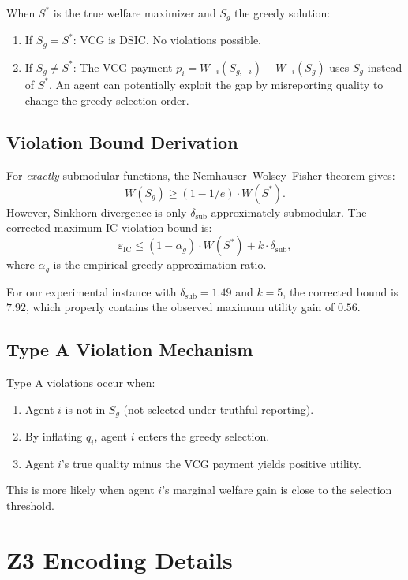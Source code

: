 \documentclass[10pt]{article}
\begin{document}
When $S^*$ is the true welfare maximizer and $S_g$ the greedy solution:
\begin{enumerate}
\item If $S_g = S^*$: VCG is DSIC. No violations possible.
\item If $S_g \neq S^*$: The VCG payment $p_i = W_{-i}(S_{g,-i}) - W_{-i}(S_g)$ uses $S_g$ instead of $S^*$. An agent can potentially exploit the gap by misreporting quality to change the greedy selection order.
\end{enumerate}

\subsection{Violation Bound Derivation}

For \emph{exactly} submodular functions, the Nemhauser--Wolsey--Fisher theorem gives:
\[
W(S_g) \geq (1 - 1/e) \cdot W(S^*).
\]
However, Sinkhorn divergence is only $\delta_{\mathrm{sub}}$-approximately submodular.
The corrected maximum IC violation bound is:
\[
\varepsilon_{\mathrm{IC}} \leq (1 - \alpha_g) \cdot W(S^*) + k \cdot \delta_{\mathrm{sub}},
\]
where $\alpha_g$ is the empirical greedy approximation ratio.

For our experimental instance with $\delta_{\mathrm{sub}} = 1.49$ and $k = 5$, the corrected bound is $7.92$, which properly contains the observed maximum utility gain of $0.56$.

\subsection{Type A Violation Mechanism}

Type A violations occur when:
\begin{enumerate}
\item Agent $i$ is not in $S_g$ (not selected under truthful reporting).
\item By inflating $q_i$, agent $i$ enters the greedy selection.
\item Agent $i$'s true quality minus the VCG payment yields positive utility.
\end{enumerate}

This is more likely when agent $i$'s marginal welfare gain is close to the selection threshold.

\section{Z3 Encoding Details}
\label{app:z3}
\end{document}
